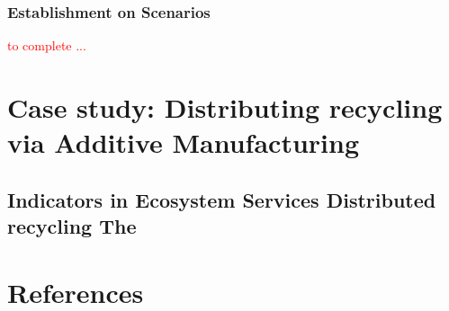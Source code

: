 \documentclass[
  14pt,
]{extarticle}
\begin{document}
\hypertarget{establishment-on-scenarios}{%
\subsubsection{Establishment on Scenarios}\label{establishment-on-scenarios}}

\textcolor{red}{to complete ... }

\hypertarget{case-study-distributing-recycling-via-additive-manufacturing}{%
\section{Case study: Distributing recycling via Additive Manufacturing}\label{case-study-distributing-recycling-via-additive-manufacturing}}

\hypertarget{indicators-in-ecosystem-services-distributed-recycling-the}{%
\subsection{Indicators in Ecosystem Services Distributed recycling The}\label{indicators-in-ecosystem-services-distributed-recycling-the}}

\newpage

\hypertarget{references}{%
\section*{References}\label{references}}
\end{document}
